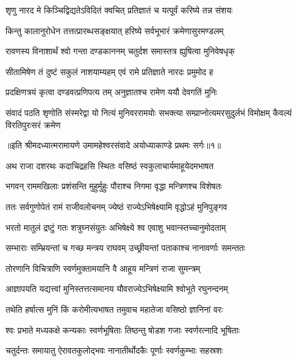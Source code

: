\twolineshloka
{शृणु नारद मे किञ्चिद्विद्यतेऽविदितं क्वचित्}
{प्रतिज्ञातं च यत्पूर्वं करिष्ये तन्न संशयः} %

\twolineshloka
{किन्तु कालानुरोधेन तत्तत्प्रारब्धसङ्क्षयात्}
{हरिष्ये सर्वभूभारं क्रमेणासुरमण्डलम्} %

\twolineshloka
{रावणस्य विनाशार्थं श्वो गन्ता दण्डकाननम्}
{चतुर्दश समास्तत्र ह्युषित्वा मुनिवेषधृक्} %

\twolineshloka
{सीतामिषेण तं दुष्टं सकुलं नाशयाम्यहम्}
{एवं रामे प्रतिज्ञाते नारदः प्रमुमोद ह} %

\twolineshloka
{प्रदक्षिणत्रयं कृत्वा दण्डवत्प्रणिपत्य तम्}
{अनुज्ञातश्च रामेण ययौ देवगतिं मुनिः} %

\fourlineindentedshloka
{संवादं पठति शृणोति संस्मरेद्वा}
{यो नित्यं मुनिवररामयोः सभक्त्या}
{सम्प्राप्नोत्यमरसुदुर्लभं विमोक्षम्}
{कैवल्यं विरतिपुरःसरं क्रमेण} %

{॥इति श्रीमदध्यात्मरामायणे उमामहेश्वरसंवादे
अयोध्याकाण्डे प्रथमः सर्गः॥१॥
}




\twolineshloka
{अथ राजा दशरथः कदाचिद्रहसि स्थितः}
{वसिष्ठं स्वकुलाचार्यमाहूयेदमभाषत} %

\twolineshloka
{भगवन् राममखिलाः प्रशंसन्ति मुहुर्मुहुः}
{पौराश्च निगमा वृद्धा मन्त्रिणश्च विशेषतः} %

\twolineshloka
{ततः सर्वगुणोपेतं रामं राजीवलोचनम्}
{ज्येष्ठं राज्येऽभिषेक्ष्यामि वृद्धोऽहं मुनिपुङ्गव} %

\twolineshloka
{भरतो मातुलं द्रष्टुं गतः शत्रुघ्नसंयुतः}
{अभिषेक्ष्ये श्व एवाशु भवान्स्तच्चानुमोदताम्} %

\twolineshloka
{सम्भाराः सम्भ्रियन्तां च गच्छ मन्त्रय राघवम्}
{उच्छ्रीयन्तां पताकाश्च नानावर्णाः समन्ततः} %

\twolineshloka
{तोरणानि विचित्राणि स्वर्णमुक्तामयानि वै}
{आहूय मन्त्रिणं राजा सुमन्त्रम्} %

\twolineshloka
{आज्ञापयति यद्यत्त्वां मुनिस्तत्तत्समानय}
{यौवराज्येऽभिषेक्ष्यामि श्वोभूते रघुनन्दनम्} %

\twolineshloka
{तथेति हर्षात्स मुनिं किं करोमीत्यभाषत}
{तमुवाच महातेजा वसिष्ठो ज्ञानिनां वरः} %

\twolineshloka
{श्वः प्रभाते मध्यकक्षे कन्यकाः स्वर्णभूषिताः}
{तिष्ठन्तु षोडश गजाः स्वर्णरत्नादि भूषिताः} %

\twolineshloka
{चतुर्दन्तः समायातु ऐरावतकुलोद्भवः}
{नानातीर्थोदकैः पूर्णाः स्वर्णकुम्भाः सहस्रशः} %


